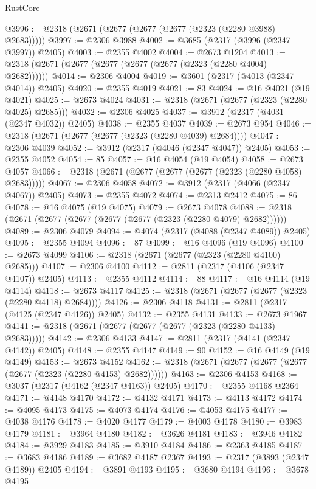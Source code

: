 \begin{lexlean}{RustCore}
\begin{coremodule}
@3996 := @2318 (@2671 (@2677 (@2677 (@2677 (@2323 (@2280 @3988) @2683)))))
@3997 := @2306 @3988
@4002 := @3685 (@2317 (@3996 (@2347 @3997)) @2405)
@4003 := @2355 @4002
@4004 := @2673 @1204
@4013 := @2318 (@2671 (@2677 (@2677 (@2677 (@2677 (@2323 (@2280 @4004) @2682))))))
@4014 := @2306 @4004
@4019 := @3601 (@2317 (@4013 (@2347 @4014)) @2405)
@4020 := @2355 @4019
@4021 := 83
@4024 := @16 @4021 (@19 @4021)
@4025 := @2673 @4024
@4031 := @2318 (@2671 (@2677 (@2323 (@2280 @4025) @2685)))
@4032 := @2306 @4025
@4037 := @3912 (@2317 (@4031 (@2347 @4032)) @2405)
@4038 := @2355 @4037
@4039 := @2673 @954
@4046 := @2318 (@2671 (@2677 (@2677 (@2323 (@2280 @4039) @2684))))
@4047 := @2306 @4039
@4052 := @3912 (@2317 (@4046 (@2347 @4047)) @2405)
@4053 := @2355 @4052
@4054 := 85
@4057 := @16 @4054 (@19 @4054)
@4058 := @2673 @4057
@4066 := @2318 (@2671 (@2677 (@2677 (@2677 (@2323 (@2280 @4058) @2683)))))
@4067 := @2306 @4058
@4072 := @3912 (@2317 (@4066 (@2347 @4067)) @2405)
@4073 := @2355 @4072
@4074 := @2313 @2412
@4075 := 86
@4078 := @16 @4075 (@19 @4075)
@4079 := @2673 @4078
@4088 := @2318 (@2671 (@2677 (@2677 (@2677 (@2677 (@2323 (@2280 @4079) @2682))))))
@4089 := @2306 @4079
@4094 := @4074 (@2317 (@4088 (@2347 @4089)) @2405)
@4095 := @2355 @4094
@4096 := 87
@4099 := @16 @4096 (@19 @4096)
@4100 := @2673 @4099
@4106 := @2318 (@2671 (@2677 (@2323 (@2280 @4100) @2685)))
@4107 := @2306 @4100
@4112 := @2811 (@2317 (@4106 (@2347 @4107)) @2405)
@4113 := @2355 @4112
@4114 := 88
@4117 := @16 @4114 (@19 @4114)
@4118 := @2673 @4117
@4125 := @2318 (@2671 (@2677 (@2677 (@2323 (@2280 @4118) @2684))))
@4126 := @2306 @4118
@4131 := @2811 (@2317 (@4125 (@2347 @4126)) @2405)
@4132 := @2355 @4131
@4133 := @2673 @1967
@4141 := @2318 (@2671 (@2677 (@2677 (@2677 (@2323 (@2280 @4133) @2683)))))
@4142 := @2306 @4133
@4147 := @2811 (@2317 (@4141 (@2347 @4142)) @2405)
@4148 := @2355 @4147
@4149 := 90
@4152 := @16 @4149 (@19 @4149)
@4153 := @2673 @4152
@4162 := @2318 (@2671 (@2677 (@2677 (@2677 (@2677 (@2323 (@2280 @4153) @2682))))))
@4163 := @2306 @4153
@4168 := @3037 (@2317 (@4162 (@2347 @4163)) @2405)
@4170 := @2355 @4168 @2364
@4171 := @4148 @4170
@4172 := @4132 @4171
@4173 := @4113 @4172
@4174 := @4095 @4173
@4175 := @4073 @4174
@4176 := @4053 @4175
@4177 := @4038 @4176
@4178 := @4020 @4177
@4179 := @4003 @4178
@4180 := @3983 @4179
@4181 := @3964 @4180
@4182 := @3626 @4181
@4183 := @3946 @4182
@4184 := @3929 @4183
@4185 := @3910 @4184
@4186 := @2363 @4185
@4187 := @3683 @4186
@4189 := @3682 @4187 @2367
@4193 := @2317 (@3893 (@2347 @4189)) @2405
@4194 := @3891 @4193
@4195 := @3680 @4194
@4196 := @3678 @4195

\end{coremodule}
\end{lexlean}
